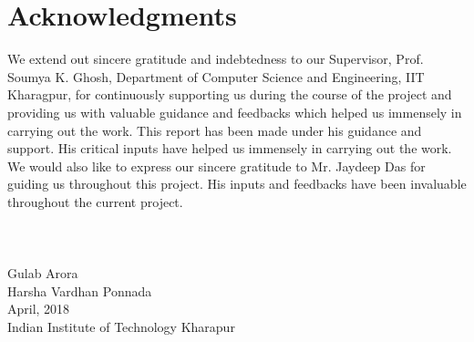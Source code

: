 \cleardoublepage
{}
{}
\chapter*{Acknowledgments}
\vspace{1.0in}
We extend out sincere gratitude and indebtedness to our Supervisor, Prof. Soumya K. Ghosh, Department of Computer Science and Engineering, IIT Kharagpur, for continuously supporting us during the course of the project and providing us with valuable guidance and feedbacks which helped us immensely in carrying out the work. This report has been made under his guidance and support. His critical inputs have helped us immensely in carrying out the work. We would also like to express our sincere gratitude to Mr. Jaydeep Das for guiding us throughout this project. His inputs and feedbacks have been invaluable throughout the current project.
\\
\\
\\ 
\\
Gulab Arora \\
Harsha Vardhan Ponnada \\
April, 2018\\
{Indian Institute of Technology Kharapur}\\
\newpage

